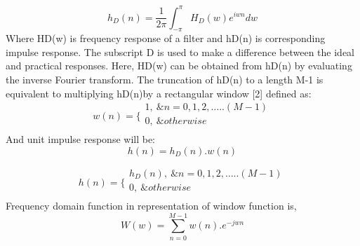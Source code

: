 \begin{equation}\tag{6.13}
h_{D} ( n ) = \frac{1}{2 \pi } \int _{- \pi }^{ \pi }H_{D} ( w ) e^{iwn}dw
\end{equation}
Where HD(w) is frequency response of a filter and hD(n) is corresponding impulse response. The subscript D is used to make a difference between the ideal and practical responses. Here, HD(w) can be obtained from hD(n) by evaluating the inverse Fourier transform. The truncation of hD(n) to a length M-1 is equivalent to multiplying hD(n)by a rectangular window [2] defined as:
\begin{equation}\tag{6.14}
w ( n ) = \{ \begin{array}{ll}
	1,~ \&n=0,1,2, \ldots .. ( M-1 ) \\
	0,~ \&otherwise\\
	\end{array}
\end{equation}
And unit impulse response will be:
\begin{equation}\tag{6.15}
h ( n ) =h_{D} ( n ) .w ( n )
\end{equation}

\begin{equation}\tag{6.16}
h ( n ) = \{ \begin{array}{ll}
	h_{D} ( n ) ,~ \&n=0,1,2, \ldots .. ( M-1 ) \\
	0,~ \&otherwise\\
	\end{array}
\end{equation}
Frequency domain function in representation of window function is,
\begin{equation}\tag{6.17}
W ( w ) = \sum _{n=0}^{M-1}w ( n ) .e^{-jwn}
\end{equation}

